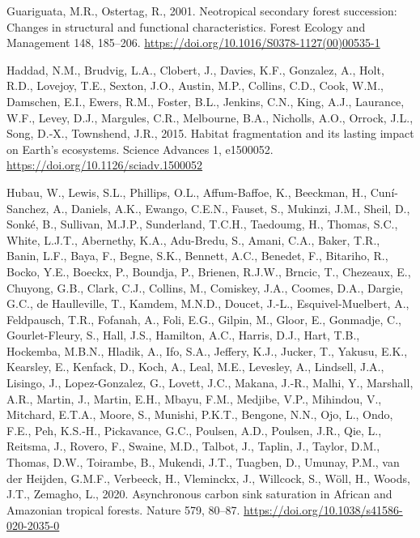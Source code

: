 \documentclass[
  12pt,
]{article}
\newlength{\cslhangindent}
\newlength{\cslentryspacingunit} %
\newenvironment{CSLReferences}[2] %
 {%
  \setlength{\parindent}{0pt}
  \ifodd #1
  \let\oldpar\par
  \def\par{\hangindent=\cslhangindent\oldpar}
  \fi
  \setlength{\parskip}{#2\cslentryspacingunit}
 }%
 {}
\begin{document}
\begin{CSLReferences}{1}{0}
\leavevmode{}%
Guariguata, M.R., Ostertag, R., 2001. Neotropical secondary forest succession: {Changes} in structural and functional characteristics. Forest Ecology and Management 148, 185--206. \url{https://doi.org/10.1016/S0378-1127(00)00535-1}

\leavevmode{}%
Haddad, N.M., Brudvig, L.A., Clobert, J., Davies, K.F., Gonzalez, A., Holt, R.D., Lovejoy, T.E., Sexton, J.O., Austin, M.P., Collins, C.D., Cook, W.M., Damschen, E.I., Ewers, R.M., Foster, B.L., Jenkins, C.N., King, A.J., Laurance, W.F., Levey, D.J., Margules, C.R., Melbourne, B.A., Nicholls, A.O., Orrock, J.L., Song, D.-X., Townshend, J.R., 2015. Habitat fragmentation and its lasting impact on {Earth}'s ecosystems. Science Advances 1, e1500052. \url{https://doi.org/10.1126/sciadv.1500052}

\leavevmode{}%
Hubau, W., Lewis, S.L., Phillips, O.L., Affum-Baffoe, K., Beeckman, H., Cuní-Sanchez, A., Daniels, A.K., Ewango, C.E.N., Fauset, S., Mukinzi, J.M., Sheil, D., Sonké, B., Sullivan, M.J.P., Sunderland, T.C.H., Taedoumg, H., Thomas, S.C., White, L.J.T., Abernethy, K.A., Adu-Bredu, S., Amani, C.A., Baker, T.R., Banin, L.F., Baya, F., Begne, S.K., Bennett, A.C., Benedet, F., Bitariho, R., Bocko, Y.E., Boeckx, P., Boundja, P., Brienen, R.J.W., Brncic, T., Chezeaux, E., Chuyong, G.B., Clark, C.J., Collins, M., Comiskey, J.A., Coomes, D.A., Dargie, G.C., de Haulleville, T., Kamdem, M.N.D., Doucet, J.-L., Esquivel-Muelbert, A., Feldpausch, T.R., Fofanah, A., Foli, E.G., Gilpin, M., Gloor, E., Gonmadje, C., Gourlet-Fleury, S., Hall, J.S., Hamilton, A.C., Harris, D.J., Hart, T.B., Hockemba, M.B.N., Hladik, A., Ifo, S.A., Jeffery, K.J., Jucker, T., Yakusu, E.K., Kearsley, E., Kenfack, D., Koch, A., Leal, M.E., Levesley, A., Lindsell, J.A., Lisingo, J., Lopez-Gonzalez, G., Lovett, J.C., Makana, J.-R., Malhi, Y., Marshall, A.R., Martin, J., Martin, E.H., Mbayu, F.M., Medjibe, V.P., Mihindou, V., Mitchard, E.T.A., Moore, S., Munishi, P.K.T., Bengone, N.N., Ojo, L., Ondo, F.E., Peh, K.S.-H., Pickavance, G.C., Poulsen, A.D., Poulsen, J.R., Qie, L., Reitsma, J., Rovero, F., Swaine, M.D., Talbot, J., Taplin, J., Taylor, D.M., Thomas, D.W., Toirambe, B., Mukendi, J.T., Tuagben, D., Umunay, P.M., van der Heijden, G.M.F., Verbeeck, H., Vleminckx, J., Willcock, S., Wöll, H., Woods, J.T., Zemagho, L., 2020. Asynchronous carbon sink saturation in {African} and {Amazonian} tropical forests. Nature 579, 80--87. \url{https://doi.org/10.1038/s41586-020-2035-0}


\end{CSLReferences}
\end{document}

